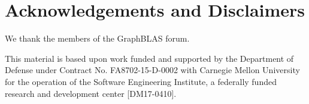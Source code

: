 %
%

\section*{Acknowledgements and Disclaimers}

We thank the members of the GraphBLAS forum.

This material is based upon work funded and supported by the Department of 
Defense under Contract No. FA8702-15-D-0002 with Carnegie Mellon University for 
the operation of the Software Engineering Institute, a federally funded research 
and development center [DM17-0410].

